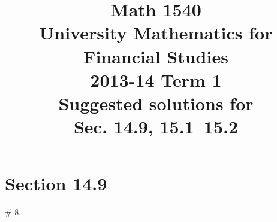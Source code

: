 \documentclass[8pt]{article} %
\title{Math 1540\\University Mathematics for Financial Studies\\2013-14 Term 1\\Suggested solutions for\\
Sec. 14.9, 15.1--15.2}
\begin{document}
\maketitle
\section{Section 14.9}
\begin{description}
	\item[\# 8.]{{\it 
		}
		}
\end{description}
\end{document}
